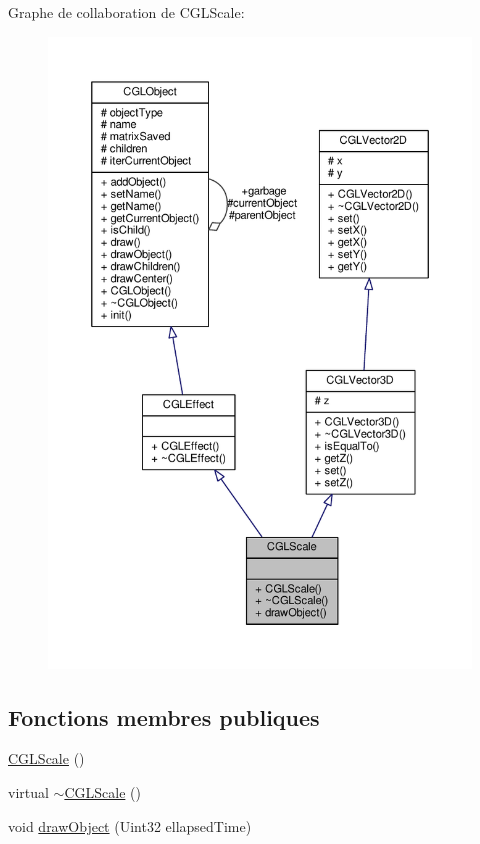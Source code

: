 Graphe de collaboration de C\-G\-L\-Scale\-:\nopagebreak
\begin{figure}[H]
\begin{center}
\leavevmode
\includegraphics[width=350pt]{dd/d3a/class_c_g_l_scale__coll__graph}
\end{center}
\end{figure}
\subsection*{Fonctions membres publiques}
\begin{DoxyCompactItemize}
\item 
\hyperlink{class_c_g_l_scale_a48ed3886215e1ee3ae43fedae36cf426}{C\-G\-L\-Scale} ()
\item 
virtual \hyperlink{class_c_g_l_scale_a8a084fe6407bc5226723dd6300089cce}{$\sim$\-C\-G\-L\-Scale} ()
\item 
void \hyperlink{class_c_g_l_scale_a27939db2fb5f900800f391bb06a387a4}{draw\-Object} (Uint32 ellapsed\-Time)
\end{DoxyCompactItemize}
